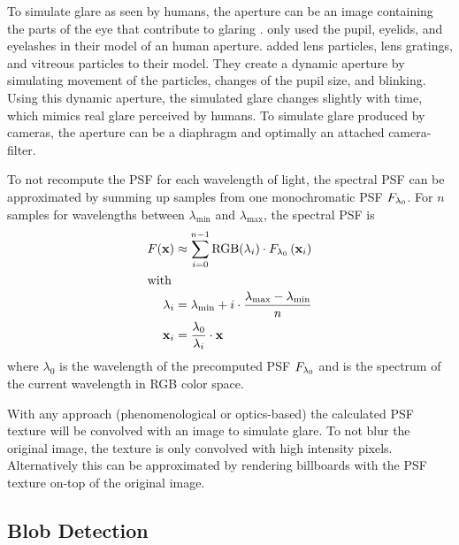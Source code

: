 To simulate glare as seen by humans, the aperture can be an image containing the parts of the eye that contribute to glaring \cite[see][Table 1]{Ritschel2009}. 
 only used the pupil, eyelids, and eyelashes in their model of an human aperture.
 added lens particles, lens gratings, and vitreous particles to their model.
They create a dynamic aperture by simulating movement of the particles, changes of the pupil size, and blinking.
Using this dynamic aperture, the simulated glare changes slightly with time, which mimics real glare perceived by humans.
To simulate glare produced by cameras, the aperture can be a diaphragm and optimally an attached camera-filter.

To not recompute the PSF for each wavelength of light, the spectral PSF \psf{} can be approximated by summing up samples from one monochromatic PSF $F_{\lambda_0}$. 
For $n$ samples for wavelengths between $\lambda_\text{min}$ and $\lambda_\text{max}$, the spectral PSF is
\begin{align}
	\label{eq:spectral-psf}
	F (\mathbf{x}) &\approx \sum_{i = 0}^{n - 1} \operatorname{RGB} (\lambda_i) \cdot F_{\lambda_0} \left( \mathbf{x}_i \right)  \\
	\intertext{with}
	\lambda_i &= \lambda_\text{min} + i \cdot \frac{\lambda_\text{max} - \lambda_\text{min}}{n} \nonumber \\
	\mathbf{x}_i &=  \frac{\lambda_0}{\lambda_i} \cdot \mathbf{x} \nonumber
\end{align}
where $\lambda_0$ is the wavelength of the precomputed PSF $F_{\lambda_0}$ and \rgb{} is the spectrum of the current wavelength in RGB color space.


With any approach (phenomenological or optics-based) the calculated PSF texture will be convolved with an image to simulate glare.
To not blur the original image, the texture is only convolved with high intensity pixels.
Alternatively this can be approximated by rendering billboards with the PSF texture on-top of the original image.

\subsection{Blob Detection}
\label{sec:blob-detection}

